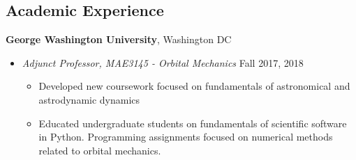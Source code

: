 
\subsection*{Academic Experience}
{}

\textbf{George Washington University}, Washington DC
    \begin{itemize}
        \item[] \textit{Adjunct Professor, MAE3145 - Orbital Mechanics} \hfill {Fall 2017, 2018}
            \begin{itemize}
                \item Developed new coursework focused on fundamentals of astronomical and astrodynamic dynamics
                \item Educated undergraduate students on fundamentals of scientific software in Python. 
                    Programming assignments focused on numerical methods related to orbital mechanics.
                    


\end{itemize}
\end{itemize}
